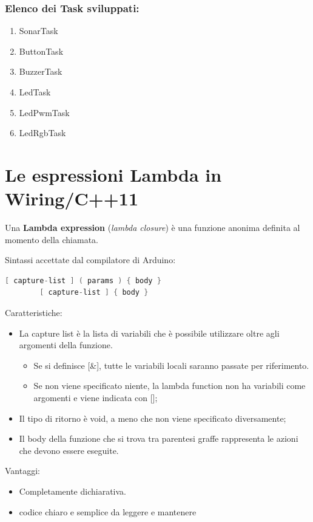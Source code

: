 \subsubsection{Elenco dei Task sviluppati:}
\begin{enumerate}
	\item SonarTask
	\item ButtonTask
	\item BuzzerTask
	\item LedTask
	\item LedPwmTask
	\item LedRgbTask
\end{enumerate}

\section{Le espressioni Lambda in Wiring/C++11}

Una \textbf{Lambda expression} (\textit{lambda closure}) è una funzione anonima definita al momento della chiamata. 

Sintassi accettate dal compilatore di Arduino:
	\begin{lstlisting}[language=C++]
		[ capture-list ] ( params ) { body }
		[ capture-list ] { body } 
	\end{lstlisting}
Caratteristiche:
\begin{itemize}
	\item La capture list è la lista di variabili che è possibile utilizzare oltre agli argomenti della funzione.
\begin{itemize}
	\item Se si definisce [\&], tutte le variabili locali saranno passate per riferimento.
	\item Se non viene specificato niente, la lambda function non ha variabili come argomenti e viene indicata con [];
\end{itemize}
	\item Il tipo di ritorno è void, a meno che non viene specificato diversamente;
	\item Il body della funzione che si trova tra parentesi graffe rappresenta le azioni che devono essere eseguite.
\end{itemize}

Vantaggi:
\begin{itemize}
	\item Completamente dichiarativa.
	\item codice chiaro e semplice da leggere e mantenere
\end{itemize}




